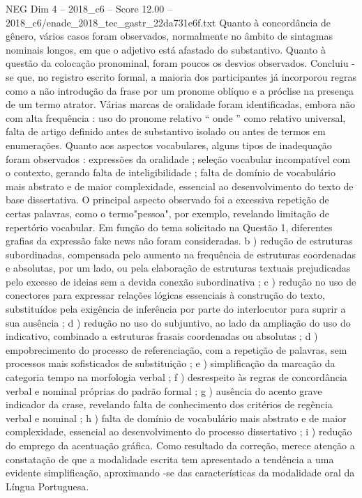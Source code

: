 \begin{textsample}{NEG Dim 4 – 2018\_c6 – Score 12.00 – 2018\_c6/enade\_2018\_tec\_gastr\_22da731e6f.txt}
Quanto à concordância de gênero, vários casos foram observados, normalmente no âmbito de sintagmas nominais longos, em que o adjetivo está afastado do substantivo.
Quanto à questão da colocação pronominal, foram poucos os desvios observados.
Concluiu -se que, no registro escrito formal, a maioria dos participantes já incorporou regras como a não introdução da frase por um pronome oblíquo e a próclise na presença de um termo atrator.
Várias marcas de oralidade foram identificadas, embora não com alta frequência : uso do pronome relativo “ onde ” como relativo universal, falta de artigo definido antes de substantivo isolado ou antes de termos em enumerações.
Quanto aos aspectos vocabulares, alguns tipos de inadequação foram observados : expressões da oralidade ; seleção vocabular incompatível com o contexto, gerando falta de inteligibilidade ; falta de domínio de vocabulário mais abstrato e de maior complexidade, essencial ao desenvolvimento do texto de base dissertativa.
O principal aspecto observado foi a excessiva repetição de certas palavras, como o termo"pessoa", por exemplo, revelando limitação de repertório vocabular.
Em função do tema solicitado na Questão 1, diferentes grafias da expressão fake news não foram consideradas. b ) redução de estruturas subordinadas, compensada pelo aumento na frequência de estruturas coordenadas e absolutas, por um lado, ou pela elaboração de estruturas textuais prejudicadas pelo excesso de ideias sem a devida conexão subordinativa ; c ) redução no uso de conectores para expressar relações lógicas essenciais à construção do texto, substituídos pela exigência de inferência por parte do interlocutor para suprir a sua ausência ; d ) redução no uso do subjuntivo, ao lado da ampliação do uso do indicativo, combinado a estruturas frasais coordenadas ou absolutas ; d ) empobrecimento do processo de referenciação, com a repetição de palavras, sem processos mais sofisticados de substituição ; e ) simplificação da marcação da categoria tempo na morfologia verbal ; f ) desrespeito às regras de concordância verbal e nominal próprias do padrão formal ; g ) ausência do acento grave indicador da crase, revelando falta de conhecimento dos critérios de regência verbal e nominal ; h ) falta de domínio de vocabulário mais abstrato e de maior complexidade, essencial ao desenvolvimento do processo dissertativo ; i ) redução do emprego da acentuação gráfica.
Como resultado da correção, merece atenção a constatação de que a modalidade escrita tem apresentado a tendência a uma evidente simplificação, aproximando -se das características da modalidade oral da Língua Portuguesa.

\end{textsample}
